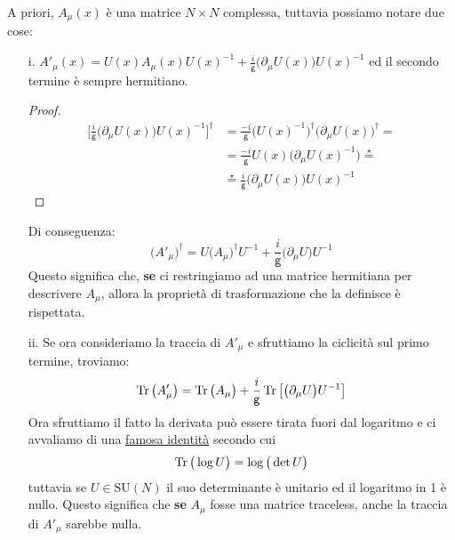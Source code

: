 \documentclass[../main.tex]{subfiles}
\begin{document}
\begin{nota}
    A priori, $A_\mu(x)$ è una matrice $N\times N$ complessa, tuttavia possiamo notare due cose:
    \begin{itemize}
        \item[i.] \(A'_\mu(x) = U(x)A_\mu(x) U(x)^{-1} + \frac{i}{\mathsf{g}}\big(\partial_\mu U(x)\big) U(x)^{-1}\) ed il secondo termine è sempre hermitiano.
        \begin{proof}
        \begin{align*}
            \bigg[\frac{i}{\mathsf{g}}\big(\partial_\mu U(x)\big) U(x)^{-1}\bigg]^\dagger &= \frac{-i}{\mathsf{g}} \big(U(x)^{-1}\big)^\dagger\big(\partial_\mu U(x)\big)^\dagger =\\
            &=\frac{-i}{\mathsf{g}} U(x)(\partial_\mu U(x)^{-1}\big) \overset{\star}{=}\\
            &\overset{\star}{=} \frac{i}{\mathsf{g}}\big(\partial_\mu U(x)\big) U(x)^{-1}
        \end{align*}
        \end{proof}
        Di conseguenza: 
        \[
        \big(A'_\mu\big)^\dagger = U\big(A_\mu\big)^\dagger U^{-1} + \frac{i}{\mathsf{g}}\big(\partial_\mu U\big) U^{-1}
        \]
        Questo significa che, \textbf{se} ci restringiamo ad una matrice hermitiana per descrivere $A_\mu$, allora la proprietà di trasformazione che la definisce è rispettata.
        
        \item[ii.] Se ora consideriamo la traccia di $A'_\mu$ e sfruttiamo la ciclicità sul primo termine, troviamo:
        \[
        \Tr\big(A'_\mu\big) = \Tr\big(A_\mu\big) + \frac{i}{\mathsf{g}}\Tr\big[\big(\partial_\mu U\big) U^{-1}\big]
        \]
        Ora sfruttiamo il fatto la derivata può essere tirata fuori dal logaritmo e ci avvaliamo di una \href{https://math.stackexchange.com/questions/154776/proof-of-2-matrix-identities-traces-logs-determinants}{famosa identità} secondo cui 
        \[
        \Tr\big(\log U\big) = \log\big(\det U\big)
        \]
        tuttavia se $U\in\textrm{SU}(N)$ il suo determinante è unitario ed il logaritmo in 1 è nullo. Questo significa che \textbf{se} $A_\mu$ fosse una matrice traceless, anche la traccia di $A'_\mu$ sarebbe nulla.
    \end{itemize}
    \label{note:Amu_traceless_and_hermitian}
\end{nota}
\end{document}

